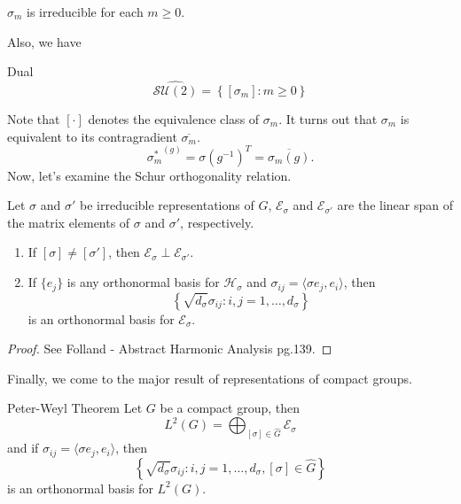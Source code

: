 \documentclass{article}
\begin{document}
\begin{theorem}
    $\sigma_m$ is irreducible for each $m\geq 0$.
\end{theorem}
Also, we have
\begin{Theorem}{Dual}
    \begin{equation}
        \widehat{\mathcal{SU}(2)} = \left\{ [\sigma_m] : m \geq 0 \right\}
    \end{equation}
\end{Theorem}
Note that $[\cdot]$ denotes the equivalence class of $\sigma_m$. It turns out that $\sigma_m$ is equivalent to its contragradient $\overline{\sigma_m}$.
\begin{equation}
    {\sigma^{*}_m}^{(g)} = \sigma(g^{-1})^{T} = \overline{\sigma_m(g)}.
\end{equation}
Now, let's examine the Schur orthogonality relation.
\begin{theorem}
    Let $\sigma$ and $\sigma'$ be irreducible representations of $G$, $\mathcal{E}_{\sigma}$ and $\mathcal{E}_{\sigma'}$ are the linear span of the matrix elements of $\sigma$ and $\sigma'$, respectively.
    \begin{enumerate}
        \item If $[\sigma] \neq [\sigma']$, then $\mathcal{E}_{\sigma} \perp \mathcal{E}_{\sigma'}$.
        \item If $\{ e_j \}$ is any orthonormal basis for $\mathcal{H}_{\sigma}$ and $\sigma_{ij} = \langle \sigma e_j, e_i \rangle$, then
            \[
                \left\{ \sqrt{d_{\sigma}}\sigma_{ij} : i,j=1,\ldots, d_{\sigma} \right\}
            \]
            is an orthonormal basis for $\mathcal{E}_{\sigma}$.
    \end{enumerate}
\end{theorem}
\begin{proof}
    See Folland - Abstract Harmonic Analysis pg.139.
\end{proof}
Finally, we come to the major result of representations of compact groups.
\begin{Theorem}{Peter-Weyl Theorem}
    Let $G$  be a compact group, then 
    \begin{equation}
        L^{2}(G) = \bigoplus^{}_{[\sigma]\in \widehat{G}} \mathcal{E}_{\sigma}
    \end{equation}
    and if $\sigma_{ij}=\langle \sigma e_j, e_i \rangle$, then 
    \begin{equation}
        \left\{ \sqrt{d_{\sigma}}\sigma_{ij} : i,j=1,\ldots,d_{\sigma}, [\sigma] \in \widehat{G} \right\}
    \end{equation}
    is an orthonormal basis for $L^{2}(G)$.
\end{Theorem}
\end{document}
